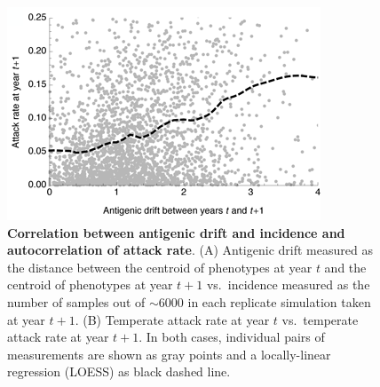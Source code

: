 \pagebreak

\begin{figure}[!c]
	\centering
	\includegraphics{figures/driftvsinc}
	\caption{\textbf{Correlation between antigenic drift and incidence and autocorrelation of attack rate}. (A) Antigenic drift measured as the distance between the centroid of phenotypes at year $t$ and the centroid of phenotypes at year $t+1$ vs.\ incidence measured as the number of samples out of $\sim6000$ in each replicate simulation taken at year $t+1$. (B) Temperate attack rate at year $t$ vs.\ temperate attack rate at year $t+1$. In both cases, individual pairs of measurements are shown as gray points and a locally-linear regression (LOESS) as black dashed line.}
	\label{driftvsinc}
\end{figure}

\pagebreak

